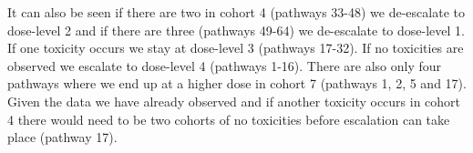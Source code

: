 It can also be seen if there are two in cohort 4 (pathways 33-48) we de-escalate to dose-level 2 and if there are three (pathways 49-64) we de-escalate to dose-level 1. If one toxicity occurs we stay at dose-level 3 (pathways 17-32). If no toxicities are observed we escalate to dose-level 4 (pathways 1-16). There are also only four pathways where we end up at a higher dose in cohort 7 (pathways 1, 2, 5 and 17). Given the data we have already observed and if another toxicity occurs in cohort 4 there would need to be two cohorts of no toxicities before escalation can take place (pathway 17). 


\begin{table}[H]
	
	\caption{\label{tab_tite-dtp:UsingDuringTrialDTPs4-7}DTPs for three additional cohorts after observing outcomes for the first three cohorts.}
	\centering
\end{table}
